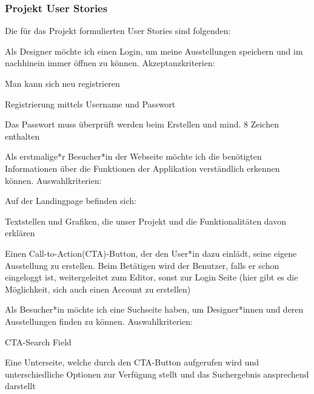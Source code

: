 \subsubsection{Projekt User Stories}
\label{ch:umsetzung:projekt-user-stories}
Die für das Projekt formulierten User Stories sind folgenden: 
\begin{compactenum}
    \item Als Designer möchte ich einen Login, um meine Ausstellungen speichern und im nachhinein immer öffnen zu können.
    Akzeptanzkriterien: 
    \begin{compactitem}
        \item Man kann sich neu registrieren
        \item Registrierung mittels Username und Passwort
        \item Das Passwort muss überprüft werden beim Erstellen und mind. 8 Zeichen enthalten
    \end{compactitem}  
    \item Als erstmalige*r Besucher*in der Webseite möchte ich die benötigten Informationen über die Funktionen der Applikation verständlich erkennen können. Auswahlkriterien: 
    \begin{compactitem}
        \item Auf der Landingpage befinden sich: 
        \begin{compactitem}
            \item Textstellen und Grafiken, die unser Projekt und die Funktionalitäten davon erklären
            \item Einen Call-to-Action(CTA)-Button, der den User*in dazu einlädt, seine eigene Ausstellung zu erstellen. Beim Betätigen wird der Benutzer, falls er schon eingeloggt ist, weitergeleitet zum Editor, sonst zur Login Seite (hier gibt es die Möglichkeit, sich auch einen Account zu erstellen)
        \end{compactitem}
    \end{compactitem} 
    \item Als Besucher*in möchte ich eine Suchseite haben, um Designer*innen und deren Ausstellungen finden zu können. Auswahlkriterien: 
    \begin{compactitem}
        \item CTA-Search Field
        \item Eine Unterseite, welche durch den CTA-Button aufgerufen wird und unterschiedliche Optionen zur Verfügung stellt und das Suchergebnis ansprechend darstellt
    \end{compactitem} 

\end{compactenum}
